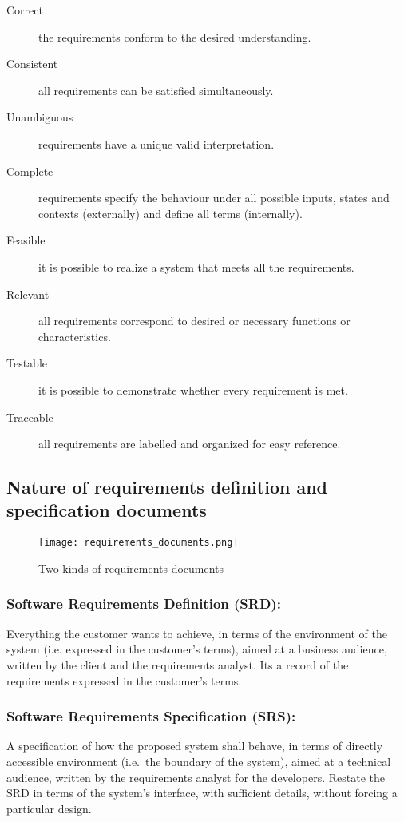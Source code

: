 \begin{description}
    \item[Correct] the requirements conform to the desired understanding.
    \item[Consistent] all requirements can be satisfied simultaneously.
    \item[Unambiguous] requirements have a unique valid interpretation.
    \item[Complete] requirements specify the behaviour under all possible inputs, states and
contexts (externally) and define all terms (internally).
    \item[Feasible] it is possible to realize a system that meets all the requirements.
    \item[Relevant] all requirements correspond to desired or necessary functions or
characteristics.
    \item[Testable] it is possible to demonstrate whether every requirement is met.
    \item[Traceable] all requirements are labelled and organized for easy reference.
\end{description}

\subsection{Nature of requirements definition and specification documents}

\begin{figure}[!ht]
    \centering
    \texttt{[image: requirements\_documents.png]}
    \caption{Two kinds of requirements documents}
\end{figure}
\FloatBarrier{}

\subsubsection{Software Requirements Definition (SRD):}
Everything the customer wants to achieve, in terms of the environment of the system (i.e.
expressed in the customer’s terms), aimed at a business audience, written by the client and
the requirements analyst. Its a record of the requirements expressed in the
customer's terms.

\subsubsection{Software Requirements Specification (SRS):}

A specification of how the proposed system shall behave, in terms of directly accessible
environment (i.e.\ the boundary of the system), aimed at a technical audience, written by
the requirements analyst for the developers.
Restate the SRD in terms of the system’s interface, with sufficient details, without forcing a
particular design.
